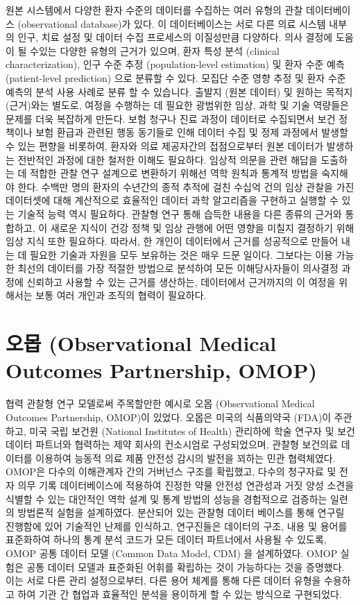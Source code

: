 \documentclass[11pt]{book}
\theoremstyle{definition}
\theoremstyle{definition}
\theoremstyle{definition}
\theoremstyle{remark}
\begin{document}
원본 시스템에서 다양한 환자 수준의 데이터를 수집하는 여러 유형의 관찰
데이터베이스 (observational database)가 있다. 이 데이터베이스는 서로
다른 의료 시스템 내부의 인구, 치료 설정 및 데이터 수집 프로세스의
이질성만큼 다양하다. 의사 결정에 도움이 될 수있는 다양한 유형의 근거가
있으며, 환자 특성 분석 (clinical characterization), 인구 수준 추정
(population-level estimation) 및 환자 수준 예측 (patient-level
prediction) 으로 분류할 수 있다. 모집단 수준 영향 추정 및 환자 수준
예측의 분석 사용 사례로 분류 할 수 있습니다. 출발지 (원본 데이터) 및
원하는 목적지 (근거)와는 별도로, 여정을 수행하는 데 필요한 광범위한
임상, 과학 및 기술 역량들은 문제를 더욱 복잡하게 만든다. 보험 청구나
진료 과정이 데이터로 수집되면서 보건 정책이나 보험 환급과 관련된 행동
동기들로 인해 데이터 수집 및 정제 과정에서 발생할 수 있는 편향을
비롯하여, 환자와 의료 제공자간의 접점으로부터 원본 데이터가 발생하는
전반적인 과정에 대한 철저한 이해도 필요하다. 임상적 의문을 관련 해답을
도출하는 데 적합한 관찰 연구 설계으로 변환하기 위해선 역학 원칙과 통계적
방법을 숙지해야 한다. 수백만 명의 환자의 수년간의 종적 추적에 걸친
수십억 건의 임상 관찰을 가진 데이터셋에 대해 계산적으로 효율적인 데이터
과학 알고리즘을 구현하고 실행할 수 있는 기술적 능력 역시 필요하다.
관찰형 연구 통해 습득한 내용을 다른 종류의 근거와 통합하고, 이 새로운
지식이 건강 정책 및 임상 관행에 어떤 영향을 미칠지 결정하기 위해 임상
지식 또한 필요하다. 따라서, 한 개인이 데이터에서 근거를 성공적으로
만들어 내는 데 필요한 기술과 자원을 모두 보유하는 것은 매우 드문 일이다.
그보다는 이용 가능한 최선의 데이터를 가장 적절한 방법으로 분석하여 모든
이해당사자들이 의사결정 과정에 신뢰하고 사용할 수 있는 근거를 생산하는,
데이터에서 근거까지의 이 여정을 위해서는 보통 여러 개인과 조직의 협력이
필요하다.

\section{오몹 (Observational Medical Outcomes Partnership,
OMOP)}\label{-observational-medical-outcomes-partnership-omop}

협력 관찰형 연구 모델로써 주목할만한 예시로 오몹 (Observational Medical
Outcomes Partnership, OMOP)이 있었다. 오몹은 미국의 식품의약국 (FDA)이
주관하고, 미국 국립 보건원 (National Institutes of Health) 관리하에 학술
연구자 및 보건 데이터 파트너와 협력하는 제약 회사의 컨소시엄로
구성되었으며, 관찰형 보건의료 데이터를 이용하여 능동적 의료 제품 안전성
감시의 발전을 꾀하는 민관 협력체였다. \citep{stang2010omop} OMOP은
다수의 이해관계자 간의 거버넌스 구조를 확립했고, 다수의 청구자료 및 전자
의무 기록 데이터베이스에 적용하여 진정한 약물 안전성 연관성과 거짓 양성
소견을 식별할 수 있는 대안적인 역학 설계 및 통계 방법의 성능을
경험적으로 검증하는 일련의 방법론적 실험을 설계하였다. 분산되어 있는
관찰형 데이터 베이스를 통해 연구릴 진행함에 있어 기술적인 난제를
인식하고, 연구진들은 데이터의 구조, 내용 및 용어를 표준화하여 하나의
통계 분석 코드가 모든 데이터 파트너에서 사용될 수 있도록, OMOP 공통
데이터 모델 (Common Data Model, CDM) 을 설계하였다.
\citep{overhage2012cdm} OMOP 실험은 공통 데이터 모델과 표준화된 어휘를
확립하는 것이 가능하다는 것을 증명했다. 이는 서로 다른 관리
설정으로부터, 다른 용어 체계를 통해 다른 데이터 유형을 수용하고 하여
기관 간 협업과 효율적인 분석을 용이하게 할 수 있는 방식으로 구현되었다.
\end{document}
